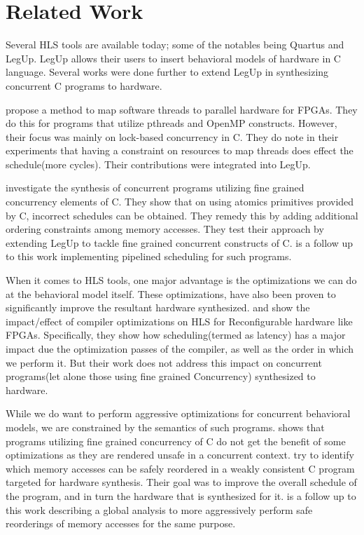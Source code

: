 
\section{Related Work}

    Several HLS tools are available today; some of the notables being Quartus and LegUp. 
    LegUp allows their users to insert behavioral models of hardware in C language. 
    Several works were done further to extend LegUp in synthesizing concurrent C programs to hardware.  
    
    \cite{DBLP:conf/fpt/ChoiBA13} propose a method to map software threads to parallel hardware for FPGAs. 
    They do this for programs that utilize pthreads and OpenMP constructs.
    However, their focus was mainly on lock-based concurrency in C. 
    They do note in their experiments that having a constraint on resources to map threads does effect the schedule(more cycles). 
    Their contributions were integrated into LegUp.

    \cite{DBLP:conf/fpga/RamanathanFWC17} investigate the synthesis of concurrent programs utilizing fine grained concurrency elements of C.
    They show that on using atomics primitives provided by C, incorrect schedules can be obtained.
    They remedy this by adding additional ordering constraints among memory accesses.
    They test their approach by extending LegUp to tackle fine grained concurrent constructs of C.
    \cite{DBLP:journals/tc/RamanathanWC18} is a follow up to this work implementing pipelined scheduling for such programs.
        
    When it comes to HLS tools, one major advantage is the optimizations we can do at the behavioral model itself. 
    These optimizations, have also been proven to significantly improve the resultant hardware synthesized.
    \cite{DBLP:conf/lcpc/CongLPZ12} and \cite{DBLP:conf/fccm/HuangLCCXBA13} show the impact/effect of compiler optimizations on HLS for Reconfigurable hardware like FPGAs.
    Specifically, they show how scheduling(termed as latency) has a major impact due the optimization passes of the compiler, as well as the order in which we perform it. 
    But their work does not address this impact on concurrent programs(let alone those using fine grained Concurrency) synthesized to hardware. 

    While we do want to perform aggressive optimizations for concurrent behavioral models, we are constrained by the semantics of such programs.
    \cite{DBLP:conf/popl/VafeiadisBCMN15} shows that programs utilizing fine grained concurrency of C do not get the benefit of some optimizations as they are rendered unsafe in a concurrent context. 
    \cite{DBLP:conf/fccm/RamanathanCW18} try to identify which memory accesses can be safely reordered in a weakly consistent C program targeted for hardware synthesis.
    Their goal was to improve the overall schedule of the program, and in turn the hardware that is synthesized for it. 
    \cite{DBLP:journals/tvlsi/RamanathanCW21} is a follow up to this work describing a global analysis to more aggressively perform safe reorderings of memory accesses for the same purpose.

